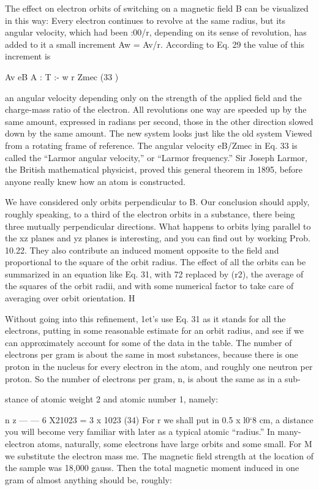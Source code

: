 {{The effect on electron orbits of switching on a magnetic field B can
be visualized in this way: Every electron continues to revolve at the
same radius, but its angular velocity, which had been :00/r, depending
on its sense of revolution, has added to it a small increment
Aw = Av/r. According to Eq. 29 the value of this increment is

Av eB
A : T :-
w r Zmec (33 )

an angular velocity depending only on the strength of the applied
field and the charge-mass ratio of the electron. All revolutions one
way are speeded up by the same amount, expressed in radians per
second, those in the other direction slowed down by the same
amount. The new system looks just like the old system Viewed from
a rotating frame of reference. The angular velocity eB/Zmec in Eq. 33
is called the ``Larmor angular velocity,'' or ``Larmor frequency.''
Sir Joseph Larmor, the British mathematical physicist, proved this
general theorem in 1895, before anyone really knew how an atom
is constructed.

We have considered only orbits perpendicular to B. Our conclusion
should apply, roughly speaking, to a third of the electron
orbits in a substance, there being three mutually perpendicular
directions. What happens to orbits lying parallel to the xz planes
and yz planes is interesting, and you can find out by working
Prob. 10.22. They also contribute an induced moment opposite to
the field and proportional to the square of the orbit radius. The
effect of all the orbits can be summarized in an equation like Eq. 31,
with 72 replaced by (r2), the average of the squares of the orbit radii,
and with some numerical factor to take care of averaging over orbit
orientation. H

Without going into this refinement, 1et's use Eq. 31 as it stands
for all the electrons, putting in some reasonable estimate for an orbit
radius, and see if we can approximately account for some of the data
in the table. The number of electrons per gram is about the same
in most substances, because there is one proton in the nucleus for
every electron in the atom, and roughly one neutron per proton. So
the number of electrons per gram, n, is about the same as in a sub-

stance of atomic weight 2 and atomic number 1, namely:

n z  ---  --- 6 X21023 = 3 x 1023 (34)
For r we shall put in 0.5 x l0‘8 cm, a distance you will become very
familiar with later as a typical atomic ``radius.'' In many-electron
atoms, naturally, some electrons have large orbits and some small.
For M we substitute the electron mass me. The magnetic field
strength at the location of the sample was 18,000 gauss. Then the
total magnetic moment induced in one gram of almost anything
should be, roughly:

}}

